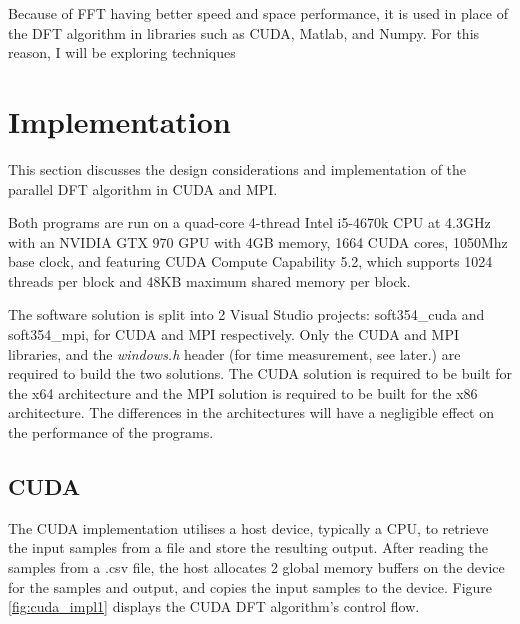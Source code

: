 \documentclass[11pt,a4paper]{article}
\begin{document}
Because of FFT having better speed and space performance, it is used in place of the DFT algorithm in libraries such as CUDA, Matlab, and Numpy. For this reason, I will be exploring techniques 

\section{Implementation}
This section discusses the design considerations and implementation of the parallel DFT algorithm in CUDA and MPI.

Both programs are run on a quad-core 4-thread Intel i5-4670k CPU at 4.3GHz with an NVIDIA GTX 970 GPU with 4GB memory, 1664 CUDA cores, 1050Mhz base clock, and featuring CUDA Compute Capability 5.2, which supports 1024 threads per block and 48KB maximum shared memory per block.

The software solution is split into 2 Visual Studio projects: soft354\_cuda and soft354\_mpi, for CUDA and MPI respectively. Only the CUDA and MPI libraries, and the \textit{windows.h} header (for time measurement, see later.) are required to build the two solutions. 
The CUDA solution is required to be built for the x64 architecture and the MPI solution is required to be built for the x86 architecture. The differences in the architectures will have a negligible effect on the performance of the programs. 

\subsection{CUDA}
The CUDA implementation utilises a host device, typically a CPU, to retrieve the input samples from a file and store the resulting output.   After reading the samples from a .csv file, the host allocates 2 global memory buffers on the device for the samples and output, and copies the input samples to the device.  Figure \ref{fig:cuda_impl1} displays the CUDA DFT algorithm's control flow.
\end{document}

